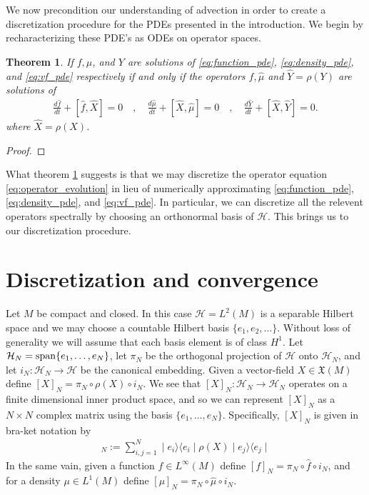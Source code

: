 \documentclass[12pt]{amsart}
\renewcommand{\H}{\ensuremath{\mathcal{H}}}
\newtheorem{thm}{Theorem}[section]
\begin{document}
We now precondition our understanding of advection in order to create 
a discretization procedure for the PDEs presented in the introduction.
We begin by recharacterizing these PDE's as ODEs on operator spaces.
\begin{thm}\label{thm:operator}
	If $f,\mu$, and $Y$ are solutions of \eqref{eq:function_pde}, \eqref{eq:density_pde}, and \eqref{eq:vf_pde} respectively
	if and only if the operators $\hat{f},\hat{\mu}$ and $\widehat{Y} = \rho(Y)$ are solutions of
	\begin{align} \label{eq:operator_evolution}
		\frac{d\hat{f}}{dt} + [ \hat{f} , \widehat{X} ] = 0 \quad,\quad
		\frac{d\hat{\mu}}{dt} + [ \widehat{X}, \hat{\mu} ] = 0 \quad,\quad
		\frac{d\widehat{Y}}{dt} + [ \widehat{X} , \widehat{Y} ] = 0.
	\end{align}
	where $\widehat{X} = \rho(X)$.
\end{thm}
\begin{proof}
\end{proof}
What theorem \ref{thm:operator} suggests is that we may discretize the operator equation \eqref{eq:operator_evolution} in lieu of numerically approximating  \eqref{eq:function_pde}, \eqref{eq:density_pde}, and \eqref{eq:vf_pde}.
In particular, we can discretize all the relevent operators spectrally by choosing an orthonormal basis of $\mathcal{H}$.
This brings us to our discretization procedure.

\section{Discretization and convergence}
\label{sec:discretization}
Let $M$ be compact and closed.  In this case $\H = L^2(M)$ is a separable Hilbert space
and we may choose a countable Hilbert basis $\{ e_1 , e_2 , \dots \}$.
Without loss of generality we will assume that each basis element is of class $H^1$.
Let $\H_N = {\rm span}\{ e_1, \dots ,e_N \}$, let
$\pi_N$ be the orthogonal projection of $\H$ onto $\H_N$,
 and let $i_N: \H_N \to \H$ be the canonical embedding.
Given a vector-field $X \in \mathfrak{X}(M)$ define $[X]_N = \pi_N \circ \rho(X) \circ i_N$.
We see that $[X]_N : \H_N \to \H_N$ 
operates on a finite dimensional inner product space,
and so we can represent $[X]_N$ as a $N\times N$ complex matrix using 
the basis $\{ e_1,\dots, e_N\}$.
Specifically, $[X]_N$ is given in bra-ket notation by
\begin{align*}
	[X]_N:= \sum_{i,j = 1}^{N} \mid e_i \rangle \langle e_i \mid \rho(X) \mid e_j \rangle  \langle e_j \mid
\end{align*}
In the same vain, given a function $f \in L^\infty(M)$ define $[f]_N = \pi_N \circ \hat{f} \circ i_N$,
and for a density $\mu \in L^1(M)$ define $[\mu]_N = \pi_N \circ \hat{\mu} \circ i_N$. 
\end{document}
